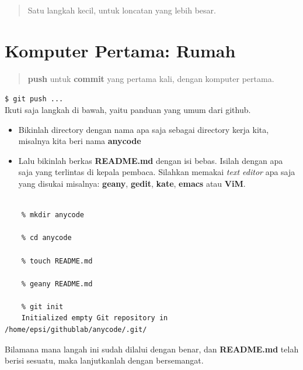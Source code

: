 \documentclass{article}
\begin{document}

\begin{quote}
Satu langkah kecil, untuk loncatan yang lebih besar.
\end{quote}

\newpage

\section{Komputer Pertama: Rumah}

\begin{quote}
\textbf{push} untuk \textbf{commit} yang pertama kali, dengan komputer pertama.
\end{quote}

\newcommand{\shellcmd}[1]{\indent\indent\texttt{\$ #1}\\}

\shellcmd{git push ...}

Ikuti saja langkah di bawah, yaitu panduan yang umum dari github.

\begin{itemize}
\item Bikinlah directory dengan nama apa saja sebagai directory kerja kita,
misalnya kita beri nama \textbf{anycode}
\item Lalu bikinlah berkas \textbf{README.md} dengan isi bebas.
Isilah dengan apa saja yang terlintas di kepala pembaca.
Silahkan memakai \textit{text editor} apa saja yang disukai misalnya:
\textbf{geany}, \textbf{gedit}, \textbf{kate}, \textbf{emacs} atau \textbf{ViM}.
\end{itemize}

\newcommand*{\Package}[1]{\texttt{#1}}%

\begin{lstlisting}[style=BashInputStyle]
    % cd githublab

    % mkdir anycode

    % cd anycode

    % touch README.md

    % geany README.md

    % git init
    Initialized empty Git repository in /home/epsi/githublab/anycode/.git/
\end{lstlisting}

Bilamana mana langah ini sudah dilalui dengan benar,
dan \textbf{README.md} telah berisi sesuatu, maka lanjutkanlah dengan bersemangat.
\end{document}
